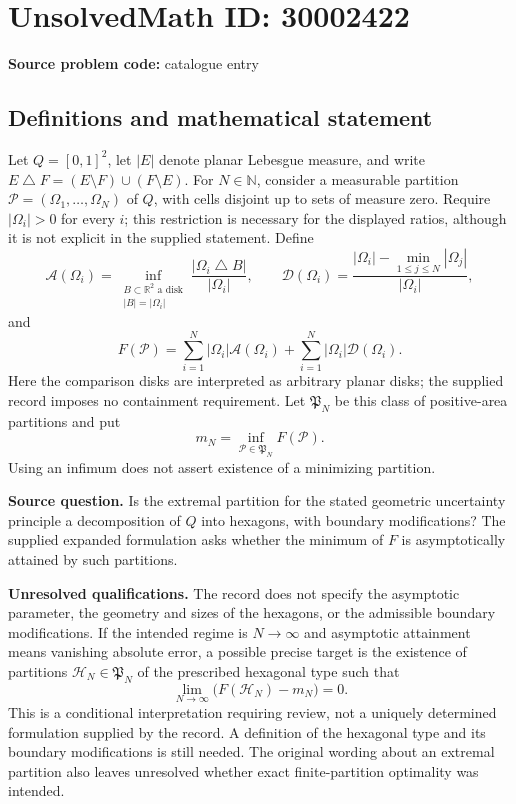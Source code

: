 \documentclass[11pt]{article}
\newcommand{\N}{\mathbb{N}}
\newcommand{\R}{\mathbb{R}}
\begin{document}
\section*{UnsolvedMath ID: 30002422}
\textbf{Source problem code:} catalogue entry
\subsection{Definitions and mathematical statement}
Let \(Q=[0,1]^2\), let \(|E|\) denote planar Lebesgue measure, and write \(E\mathbin\triangle F=(E\setminus F)\cup(F\setminus E)\). For \(N\in\N\), consider a measurable partition \(\mathcal P=(\Omega_1,\ldots,\Omega_N)\) of \(Q\), with cells disjoint up to sets of measure zero. Require \(|\Omega_i|>0\) for every \(i\); this restriction is necessary for the displayed ratios, although it is not explicit in the supplied statement. Define
\[
\mathcal A(\Omega_i)=\inf_{\substack{B\subset\R^2\text{ a disk}\\|B|=|\Omega_i|}}\frac{|\Omega_i\mathbin\triangle B|}{|\Omega_i|},\qquad
\mathcal D(\Omega_i)=\frac{|\Omega_i|-\min_{1\le j\le N}|\Omega_j|}{|\Omega_i|},
\]
and
\[
F(\mathcal P)=\sum_{i=1}^{N}|\Omega_i|\mathcal A(\Omega_i)+\sum_{i=1}^{N}|\Omega_i|\mathcal D(\Omega_i).
\]
Here the comparison disks are interpreted as arbitrary planar disks; the supplied record imposes no containment requirement. Let \(\mathfrak P_N\) be this class of positive-area partitions and put
\[
m_N=\inf_{\mathcal P\in\mathfrak P_N}F(\mathcal P).
\]
Using an infimum does not assert existence of a minimizing partition.

\textbf{Source question.} Is the extremal partition for the stated geometric uncertainty principle a decomposition of \(Q\) into hexagons, with boundary modifications? The supplied expanded formulation asks whether the minimum of \(F\) is asymptotically attained by such partitions.

\textbf{Unresolved qualifications.} The record does not specify the asymptotic parameter, the geometry and sizes of the hexagons, or the admissible boundary modifications. If the intended regime is \(N\to\infty\) and asymptotic attainment means vanishing absolute error, a possible precise target is the existence of partitions \(\mathcal H_N\in\mathfrak P_N\) of the prescribed hexagonal type such that
\[
\lim_{N\to\infty}\bigl(F(\mathcal H_N)-m_N\bigr)=0.
\]
This is a conditional interpretation requiring review, not a uniquely determined formulation supplied by the record. A definition of the hexagonal type and its boundary modifications is still needed. The original wording about an extremal partition also leaves unresolved whether exact finite-partition optimality was intended.
\end{document}
